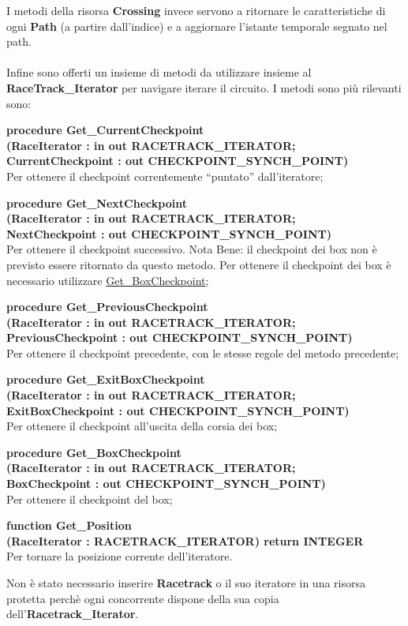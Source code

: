 I metodi della risorsa \textbf{Crossing} invece servono a ritornare le caratteristiche di ogni \textbf{Path} (a partire dall'indice) e a aggiornare
l'istante temporale segnato nel path.\\\\
Infine sono offerti un insieme di metodi da utilizzare insieme al \textbf{RaceTrack\_Iterator} per navigare iterare il circuito. I metodi sono pi\`{u}
rilevanti sono:
\begin{description}
\item{\textbf{procedure Get\_CurrentCheckpoint\\(RaceIterator : in out RACETRACK\_ITERATOR;\\ CurrentCheckpoint : out CHECKPOINT\_SYNCH\_POINT)}}\\
Per ottenere il checkpoint correntemente ``puntato'' dall'iteratore;
\item{\textbf{procedure Get\_NextCheckpoint\\(RaceIterator : in out RACETRACK\_ITERATOR;\\ NextCheckpoint : out CHECKPOINT\_SYNCH\_POINT)}}\\
Per ottenere il checkpoint successivo. Nota Bene: il checkpoint dei box non \`{e} previsto essere ritornato da questo metodo. Per ottenere il
checkpoint dei box \`{e} necessario utilizzare \underline{Get\_BoxCheckpoint};
\item{\textbf{procedure Get\_PreviousCheckpoint\\(RaceIterator : in out RACETRACK\_ITERATOR;\\ PreviousCheckpoint : out CHECKPOINT\_SYNCH\_POINT)}}\\
Per ottenere il checkpoint precedente, con le stesse regole del metodo precedente;
\item{\textbf{procedure Get\_ExitBoxCheckpoint\\(RaceIterator : in out RACETRACK\_ITERATOR;\\ ExitBoxCheckpoint : out CHECKPOINT\_SYNCH\_POINT)}}\\
Per ottenere il checkpoint all'uscita della corsia dei box;
\item{\textbf{procedure Get\_BoxCheckpoint\\(RaceIterator : in out RACETRACK\_ITERATOR;\\ BoxCheckpoint : out CHECKPOINT\_SYNCH\_POINT)}}\\
Per ottenere il checkpoint del box;
\item{\textbf{function Get\_Position\\(RaceIterator : RACETRACK\_ITERATOR) return INTEGER}}\\
Per tornare la posizione corrente dell'iteratore.
\end{description}
Non \`{e} stato necessario inserire \textbf{Racetrack} o il suo iteratore in una risorsa protetta perch\`{e} ogni concorrente dispone della
sua copia dell'\textbf{Racetrack\_Iterator}.
\newpage
